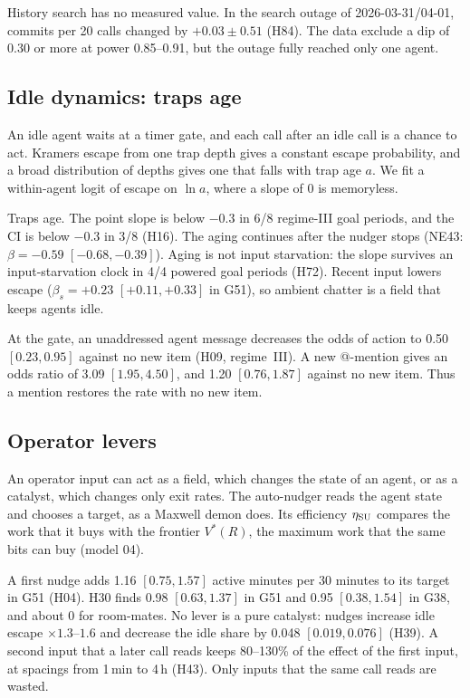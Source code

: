 History search has no measured value.
In the search outage of 2026-03-31/04-01, commits per 20 calls changed by $+0.03\pm0.51$ (H84).
The data exclude a dip of 0.30 or more at power 0.85--0.91, but the outage fully reached only one agent.

\subsection{Idle dynamics: traps age}
\label{sec:info-traps}

An idle agent waits at a timer gate, and each call after an idle call is a chance to act.
Kramers escape from one trap depth gives a constant escape probability, and a broad distribution of depths gives one that falls with trap age $a$.
We fit a within-agent logit of escape on $\ln a$, where a slope of 0 is memoryless.

Traps age.
The point slope is below $-0.3$ in 6/8 regime-III goal periods, and the CI is below $-0.3$ in 3/8 (H16).
The aging continues after the nudger stops (NE43: $\beta=-0.59$ $[-0.68,-0.39]$).
Aging is not input starvation: the slope survives an input-starvation clock in 4/4 powered goal periods (H72).
Recent input lowers escape ($\beta_s=+0.23$ $[+0.11,+0.33]$ in G51), so ambient chatter is a field that keeps agents idle.

At the gate, an unaddressed agent message decreases the odds of action to 0.50 $[0.23, 0.95]$ against no new item (H09, regime~III).
A new @-mention gives an odds ratio of 3.09 $[1.95, 4.50]$, and 1.20 $[0.76, 1.87]$ against no new item.
Thus a mention restores the rate with no new item.

\subsection{Operator levers}
\label{sec:info-levers}

An operator input can act as a field, which changes the state of an agent, or as a catalyst, which changes only exit rates.
The auto-nudger reads the agent state and chooses a target, as a Maxwell demon does.
Its efficiency $\eta_{\rm SU}$ compares the work that it buys with the frontier $V^*(R)$, the maximum work that the same bits can buy (model 04).

A first nudge adds 1.16 $[0.75, 1.57]$ active minutes per 30 minutes to its target in G51 (H04).
H30 finds 0.98 $[0.63, 1.37]$ in G51 and 0.95 $[0.38, 1.54]$ in G38, and about 0 for room-mates.
No lever is a pure catalyst: nudges increase idle escape $\times1.3$--$1.6$ and decrease the idle share by 0.048 $[0.019, 0.076]$ (H39).
A second input that a later call reads keeps 80--130\% of the effect of the first input, at spacings from 1\,min to 4\,h (H43).
Only inputs that the same call reads are wasted.

